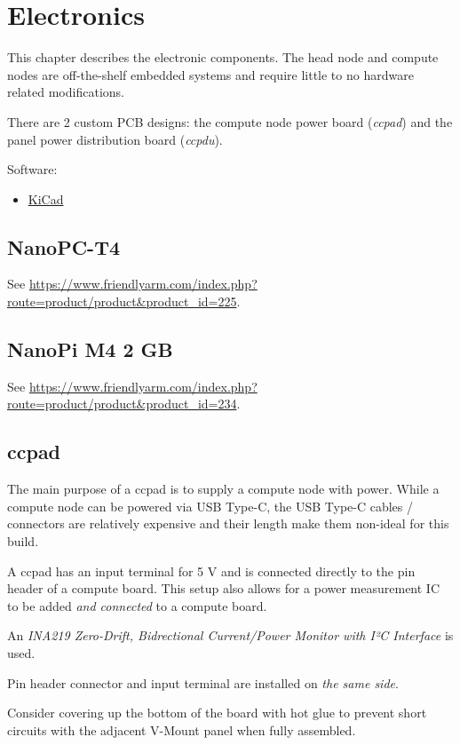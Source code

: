 \chapter{Electronics}

This chapter describes the electronic components.
The head node and compute nodes are off-the-shelf embedded systems and require little to no hardware related modifications.

There are 2 custom PCB designs: the compute node power board (\textit{ccpad}) and the panel power distribution board (\textit{ccpdu}).

Software:

\begin{itemize}
	\item \href{http://kicad-pcb.org/}{KiCad}
\end{itemize}

\section{NanoPC-T4}

See \url{https://www.friendlyarm.com/index.php?route=product/product&product_id=225}.

\section{NanoPi M4 2 GB}

See \url{https://www.friendlyarm.com/index.php?route=product/product&product_id=234}.

\section{ccpad}

The main purpose of a ccpad is to supply a compute node with power.
While a compute node can be powered via USB Type-C, the USB Type-C cables / connectors are relatively expensive and their length make them non-ideal for this build.

A ccpad has an input terminal for 5 V and is connected directly to the pin header of a compute board.
This setup also allows for a power measurement IC to be added \emph{and connected} to a compute board.

An \textit{INA219 Zero-Drift, Bidrectional Current/Power Monitor with I²C Interface} is used.

Pin header connector and input terminal are installed on \emph{the same side}.

Consider covering up the bottom of the board with hot glue to prevent short circuits with the adjacent V-Mount panel when fully assembled.

